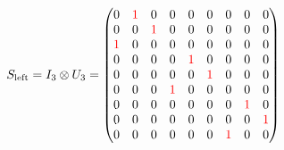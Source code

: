 \begin{align}
  S_{\text{left}} = I_3 \otimes U_3 =
  \begin{pmatrix}
    0                  & \textcolor{red}{1} & 0                  & 0                  & 0                  & 0                  & 0                  & 0                  & 0                  \\
    0                  & 0                  & \textcolor{red}{1} & 0                  & 0                  & 0                  & 0                  & 0                  & 0                  \\
    \textcolor{red}{1} & 0                  & 0                  & 0                  & 0                  & 0                  & 0                  & 0                  & 0                  \\
    0                  & 0                  & 0                  & 0                  & \textcolor{red}{1} & 0                  & 0                  & 0                  & 0                  \\
    0                  & 0                  & 0                  & 0                  & 0                  & \textcolor{red}{1} & 0                  & 0                  & 0                  \\
    0                  & 0                  & 0                  & \textcolor{red}{1} & 0                  & 0                  & 0                  & 0                  & 0                  \\
    0                  & 0                  & 0                  & 0                  & 0                  & 0                  & 0                  & \textcolor{red}{1} & 0                  \\
    0                  & 0                  & 0                  & 0                  & 0                  & 0                  & 0                  & 0                  & \textcolor{red}{1} \\
    0                  & 0                  & 0                  & 0                  & 0                  & 0                  & \textcolor{red}{1} & 0                  & 0
  \end{pmatrix}
\end{align}

